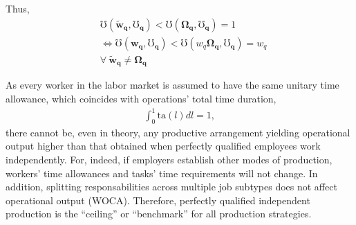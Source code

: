 \documentclass[hidelinks, nonatbib]{elsarticle}
\begin{document}
\begin{enumerate}
    Thus, 
    \begin{align}
        &
        \mho(
            \boldsymbol{\tilde{w}_{q}},
            \boldsymbol{\mho_q}
        ) < 
        \mho(
            \boldsymbol{\Omega_{q}},
            \boldsymbol{\mho_q}
        ) 
        = 1
        \\
        &\iff
        \mho(
            \boldsymbol{w_{q}},
            \boldsymbol{\mho_q}
        ) < 
        \mho(
            w_{q}
            \boldsymbol{\Omega_{q}},
            \boldsymbol{\mho_q}
        ) 
        = w_q
        \\
        &
        \forall
        \
        \boldsymbol{\tilde{w}_{q}}
        \neq
        \boldsymbol{\Omega_{q}}
    \end{align}

    As every worker in the labor market is assumed to have the same unitary time allowance, which coincides with operations' total time duration,
        \begin{gather}
            \int_{0}^{1}{
                \text{ta}(l)
                dl
            }
            =
            1
            ,
        \end{gather}
        there cannot be, even in theory, any productive arrangement yielding operational output higher than that obtained when perfectly qualified employees work independently. For, indeed, if employers establish other modes of production, workers' time allowances and tasks' time requirements will not change. In addition, splitting responsabilities across multiple job subtypes does not affect operational output (WOCA). Therefore, perfectly qualified independent production is the ``ceiling'' or ``benchmark'' for all production strategies.
        

\end{enumerate}
\end{document}
